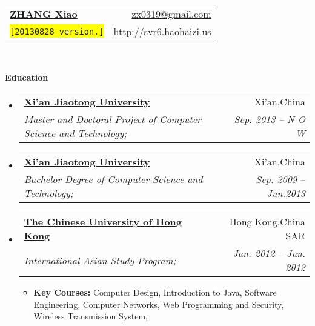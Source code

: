 \documentclass[letterpaper,11pt]{article}
\makeatletter
\newcommand{\resitem}[1]{\item #1 \vspace{-2pt}}
\newcommand{\resheading}[1]{{\large \colorbox{mygrey}{\begin{minipage}{\textwidth}{\textbf{#1 \vphantom{p\^{E}}}}\end{minipage}}}}
\newcommand{\ressubheading}[4]{
\begin{tabular*}{6.5in}{l@{\extracolsep{\fill}}r}
		\textbf{#1} & #2 \\
		\textit{#3} & \textit{#4} \\
\end{tabular*}\vspace{-6pt}}
\makeatother
\begin{document}
\newcommand{\mywebheader}{
\begin{tabular*}{7in}{l@{\extracolsep{\fill}}r}
	\textbf{\href{http://svr6.haohaizi.us/}{\LARGE ZHANG Xiao}} & \href{mailto:zx0319@gmail.com}{zx0319@gmail.com}\\
	{\footnotesize \texttt{\colorbox{yellow}{[20130828 version.]}}} & \href{http://svr6.haohaizi.us}{http://svr6.haohaizi.us} \\
	\end{tabular*}
\\
\vspace{0.1in}}

\mywebheader

\resheading{Education}
	\begin{itemize}
		\item
			\ressubheading{\href{http://www.xjtu.edu.cn}{Xi'an Jiaotong University}}{Xi'an,China}{\href{http://www.cs.xjtu.edu.cn}{Master and Doctoral Project of Computer Science and Technology};}{Sep. 2013 --   N O W }

		\item
			\ressubheading{\href{http://www.xjtu.edu.cn}{Xi'an Jiaotong University}}{Xi'an,China}{\href{http://www.cs.xjtu.edu.cn}{Bachelor Degree of Computer Science and Technology};}{Sep. 2009 --  Jun.2013}
			
		\item
			\ressubheading{\href{http://www.cuhk.edu.hk}{The Chinese University of Hong Kong}}{Hong Kong,China SAR}{{International Asian Study Program};}{Jan. 2012 -- Jun. 2012}
				{ \footnotesize
				\begin{itemize}
					\resitem
					{\textbf{Key Courses:}
						{Computer Design},
						{Introduction to Java},
						{Software Engineering},
						{Computer Networks},
						{Web Programming and Security},
						{Wireless Transmission System},
					}
				\end{itemize}
			}
	\end{itemize} %
\end{document}
